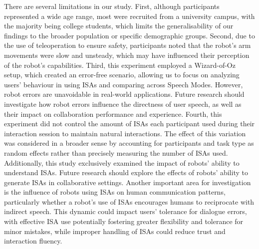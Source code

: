 There are several limitations in our study. First, although participants represented a wide age range, most were recruited from a university campus, with the majority being college students, which limits the generalisability of our findings to the broader population or specific demographic groups. Second, due to the use of teleoperation to ensure safety, participants noted that the robot’s arm movements were slow and unsteady, which may have influenced their perception of the robot’s capabilities. Third, this experiment employed a Wizard-of-Oz setup, which created an error-free scenario, allowing us to focus on analyzing users' behaviour in using ISAs and comparing across Speech Modes. However, robot errors are unavoidable in real-world applications. Future research should investigate how robot errors influence the directness of user speech, as well as their impact on collaboration performance and experience. Fourth, this experiment did not control the amount of ISAs each participant used during their interaction session to maintain natural interactions. The effect of this variation was considered in a broader sense by accounting for participants and task type as random effects rather than precisely measuring the number of ISAs used. Additionally, this study exclusively examined the impact of robots' ability to understand ISAs. Future research should explore the effects of robots' ability to generate ISAs in collaborative settings. Another important area for investigation is the influence of robots using ISAs on human communication patterns, particularly whether a robot’s use of ISAs encourages humans to reciprocate with indirect speech. This dynamic could impact users' tolerance for dialogue errors, with effective ISA use potentially fostering greater flexibility and tolerance for minor mistakes, while improper handling of ISAs could reduce trust and interaction fluency.
\vspace{-0.5em}
